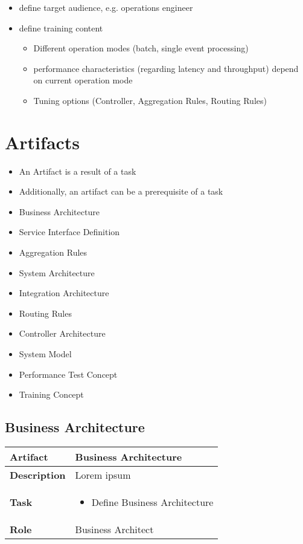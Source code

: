 \begin{itemize}
	\item define target audience, e.g. operations engineer
	\item define training content
	\begin{itemize}
		\item Different operation modes (batch, single event processing)
		\item performance characteristics (regarding latency and throughput) depend on current operation mode
		\item Tuning options (Controller, Aggregation Rules, Routing Rules)
	\end{itemize}
\end{itemize}

\section{Artifacts}

\begin{itemize}
	\item An Artifact is a result of a task
	\item Additionally, an artifact can be a prerequisite of a task
\end{itemize}

\begin{itemize}
	\item Business Architecture
	\item Service Interface Definition
	\item Aggregation Rules
	\item System Architecture
	\item Integration Architecture
	\item Routing Rules
	\item Controller Architecture
	\item System Model
	\item Performance Test Concept
	\item Training Concept
\end{itemize}

\subsection{Business Architecture}
\begin{minipage}{\textwidth}
 \label{table:ch6_Artifact_Business_Architecture}
\begin{tabular}
	{|m{2cm}|m{10cm}|} \hline \bfseries Artifact & Business Architecture\\
	\hline \bfseries Description & Lorem ipsum\\
	\hline \bfseries Task & 
	\begin{itemize}
		\item Define Business Architecture 
	\end{itemize}
	\\
	\hline \bfseries Role & Business Architect\\
	\hline 
\end{tabular}
\end{minipage}

